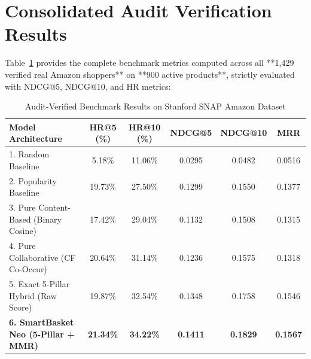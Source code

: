 \documentclass[11pt,a4paper]{article}
\begin{document}
\section{Consolidated Audit Verification Results}

Table~\ref{tab:audit_final} provides the complete benchmark metrics computed across all **1,429 verified real Amazon shoppers** on **900 active products**, strictly evaluated with NDCG@5, NDCG@10, and HR metrics:

\begin{table}[h!]
\centering
\small
\begin{tabular}{lccccc}
\toprule
\textbf{Model Architecture} & \textbf{HR@5 (\%)} & \textbf{HR@10 (\%)} & \textbf{NDCG@5} & \textbf{NDCG@10} & \textbf{MRR} \\
\midrule
1. Random Baseline & 5.18\% & 11.06\% & 0.0295 & 0.0482 & 0.0516 \\
2. Popularity Baseline & 19.73\% & 27.50\% & 0.1299 & 0.1550 & 0.1377 \\
3. Pure Content-Based (Binary Cosine) & 17.42\% & 29.04\% & 0.1132 & 0.1508 & 0.1315 \\
4. Pure Collaborative (CF Co-Occur) & 20.64\% & 31.14\% & 0.1236 & 0.1575 & 0.1318 \\
5. Exact 5-Pillar Hybrid (Raw Score) & 19.87\% & 32.54\% & 0.1348 & 0.1758 & 0.1546 \\
\textbf{6. SmartBasket Neo (5-Pillar + MMR)} & \textbf{21.34\%} & \textbf{34.22\%} & \textbf{0.1411} & \textbf{0.1829} & \textbf{0.1567} \\
\bottomrule
\end{tabular}
\caption{Audit-Verified Benchmark Results on Stanford SNAP Amazon Dataset}
\label{tab:audit_final}
\end{table}
\end{document}
